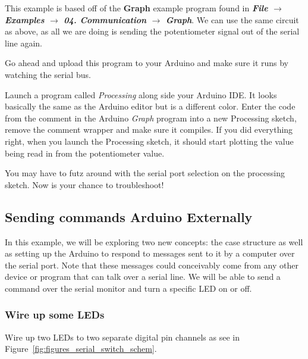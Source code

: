 \documentclass[11pt,a4paper]{article}
\begin{document}
This example is based off of the \textbf{Graph} example program found in \textbf{\emph{File} $\rightarrow$ \emph{Examples} $\rightarrow$ \emph{04. Communication} $\rightarrow$ \emph{Graph}}.  We can use the same circuit as above, as all we are doing is sending the potentiometer signal out of the serial line again. 

Go ahead and upload this program to your Arduino and make sure it runs by watching the serial bus.

Launch a program called \emph{Processing} along side your Arduino IDE.  It looks basically the same as the Arduino editor but is a different color.  Enter the code from the comment in the Arduino \emph{Graph} program into a new Processing sketch, remove the comment wrapper and make sure it compiles.  If you did everything right, when you launch the Processing sketch, it should start plotting the value being read in from the potentiometer value.

You may have to futz around with the serial port selection on the processing sketch.  Now is your chance to troubleshoot!


\subsection{Sending commands Arduino Externally} %
\label{sub:sending_commands_arduino_externally}
In this example, we will be exploring two new concepts: the case structure as well as setting up the Arduino to respond to messages sent to it by a computer over the serial port.  Note that these messages could conceivably come from any other device or program that can talk over a serial line.  We will be able to send a command over the serial monitor and turn a specific LED on or off.

\subsubsection{Wire up some LEDs} %
\label{ssub:wire_up_some_leds}
Wire up two LEDs to two separate digital pin channels as see in Figure~\ref{fig:figures_serial_switch_schem}.
\end{document}
